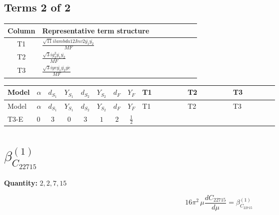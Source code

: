 \documentclass[8pt]{article}
\begin{document}
\begin{landscape}
\subsection*{Terms 2 of 2}
\begin{center}
\begin{tabular}{@{}c >{\raggedright\arraybackslash}p{0.82\linewidth}@{}}
\toprule
Column & Representative term structure \\
\midrule
T1 & \(\displaystyle \frac{\sqrt{11} i lambda12Inv2 \overline{y_{1}} \overline{y_{2}}}{MF}\) \\
\midrule
T2 & \(\displaystyle \frac{\sqrt{3} i g_{2}^{2} \overline{y_{1}} \overline{y_{2}}}{MF}\) \\
\midrule
T3 & \(\displaystyle \frac{\sqrt{3} i ye \overline{y_{1}} \overline{y_{2}} \overline{ye}}{MF}\) \\
\midrule
\bottomrule
\end{tabular}
\end{center}
\smallskip
\tiny
\begin{longtable}{@{}llcccccc >{\raggedright\arraybackslash}p{0.21\linewidth} >{\raggedright\arraybackslash}p{0.21\linewidth} >{\raggedright\arraybackslash}p{0.21\linewidth}@{}}
\toprule
Model & $\alpha$ & $d_{S_1}$ & $Y_{S_1}$ & $d_{S_2}$ & $Y_{S_2}$ & $d_F$ & $Y_F$ & T1 & T2 & T3 \\
\midrule
\endfirsthead
\toprule
Model & $\alpha$ & $d_{S_1}$ & $Y_{S_1}$ & $d_{S_2}$ & $Y_{S_2}$ & $d_F$ & $Y_F$ & T1 & T2 & T3 \\
\midrule
\endhead
T3-E & $0$ & $3$ & $0$ & $3$ & $1$ & $2$ & $\frac{1}{2}$ & \scriptsize\adjustbox{max width=\linewidth}{$\begin{gathered} \frac{3 \sqrt{11} i lambda12Inv2 \overline{y_{1}} \overline{y_{2}}}{22 MF}\end{gathered}$} & \scriptsize\adjustbox{max width=\linewidth}{$\begin{gathered} \frac{11 \sqrt{3} i g_{2}^{2} \overline{y_{1}} \overline{y_{2}}}{8 MF}\end{gathered}$} & \scriptsize\adjustbox{max width=\linewidth}{$\begin{gathered} - \frac{\sqrt{3} i ye \overline{y_{1}} \overline{y_{2}} \overline{ye}}{12 MF}\end{gathered}$} \\
\midrule
\bottomrule
\end{longtable}
\clearpage
\section*{$\beta_{C_{22715}}^{(1)}$}
\noindent\textbf{Quantity: }$\mathrm{2,2,7,15}$\par\smallskip
\[16\pi^2\,\mu\frac{d C_{22715}}{d\mu}=\beta_{C_{22715}}^{(1)}\]

\end{landscape}
\end{document}
